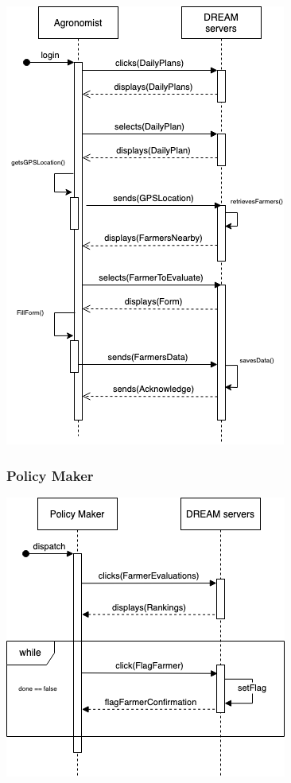 \begin{center}
\includegraphics[scale=0.6]{Files/sequence_disgrams/thePNGs/agronomist_sendReport.png}\\
\end{center}

\subsubsection{Policy Maker}

\begin{center}
\includegraphics[scale=0.6]{Files/sequence_disgrams/thePNGs/policy_setFlag.png}\\
\end{center}

